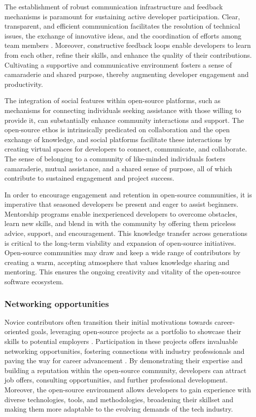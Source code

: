 The establishment of robust communication infrastructure and feedback mechanisms is paramount for sustaining active developer participation. Clear, transparent, and efficient communication facilitates the resolution of technical issues, the exchange of innovative ideas, and the coordination of efforts among team members \cite{05bitzer2007intrinsic,13li2012leadership}. Moreover, constructive feedback loops enable developers to learn from each other, refine their skills, and enhance the quality of their contributions. Cultivating a supportive and communicative environment fosters a sense of camaraderie and shared purpose, thereby augmenting developer engagement and productivity.

The integration of social features within open-source platforms, such as mechanisms for connecting individuals seeking assistance with those willing to provide it, can substantially enhance community interactions and support. The open-source ethos is intrinsically predicated on collaboration and the open exchange of knowledge, and social platforms facilitate these interactions by creating virtual spaces for developers to connect, communicate, and collaborate. The sense of belonging to a community of like-minded individuals fosters camaraderie, mutual assistance, and a shared sense of purpose, all of which contribute to sustained engagement and project success.

In order to encourage engagement and retention in open-source communities, it is imperative that seasoned developers be present and eager to assist beginners. Mentorship programs enable inexperienced developers to overcome obstacles, learn new skills, and blend in with the community by offering them priceless advice, support, and encouragement. This knowledge transfer across generations is critical to the long-term viability and expansion of open-source initiatives. Open-source communities may draw and keep a wide range of contributors by creating a warm, accepting atmosphere that values knowledge sharing and mentoring. This ensures the ongoing creativity and vitality of the open-source software ecosystem.



\subsubsection{Networking opportunities}
Novice contributors often transition their initial motivations towards career-oriented goals, leveraging open-source projects as a portfolio to showcase their skills to potential employers \cite{05bitzer2007intrinsic,11gerosa2021shifting}. Participation in these projects offers invaluable networking opportunities, fostering connections with industry professionals and paving the way for career advancement \cite{10wu2007empirical,11gerosa2021shifting,13li2012leadership}. By demonstrating their expertise and building a reputation within the open-source community, developers can attract job offers, consulting opportunities, and further professional development. Moreover, the open-source environment allows developers to gain experience with diverse technologies, tools, and methodologies, broadening their skillset and making them more adaptable to the evolving demands of the tech industry.

